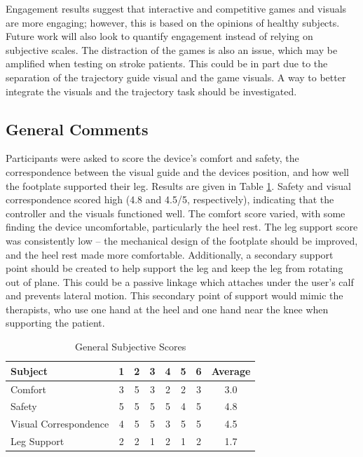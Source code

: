 \documentclass[12pt]{report}
\begin{document}
	Engagement results suggest that interactive and competitive games and visuals are more engaging; however, this is based on the opinions of healthy subjects. Future work will also look to quantify engagement instead of relying on subjective scales. The distraction of the games is also an issue, which may be amplified when testing on stroke patients. This could be in part due to the separation of the trajectory guide visual and the game visuals. A way to better integrate the visuals and the trajectory task should be investigated. 
	
	
\subsection{General Comments} \label{sec:general}
	
	Participants were asked to score the device's comfort and safety, the correspondence between the visual guide and the devices position, and how well the footplate supported their leg. Results are given in Table \ref{tab:general}. Safety and visual correspondence scored high (4.8 and 4.5/5, respectively), indicating that the controller and the visuals functioned well. The comfort score varied, with some finding the device uncomfortable, particularly the heel rest. The leg support score was consistently low -- the mechanical design of the footplate should be improved, and the heel rest made more comfortable. Additionally, a secondary support point should be created to help support the leg and keep the leg from rotating out of plane. This could be a passive linkage which attaches under the user's calf and prevents lateral motion. This secondary point of support would mimic the therapists, who use one hand at the heel and one hand near the knee when supporting the patient. 
	
	\begin{table}[h] \label{tab:general}
	\centering \doublespacing
	\caption{General Subjective Scores}
	\begin{tabular}{l c c c c c c c }
	\toprule
	Subject & 1 & 2 & 3 & 4 & 5 & 6 & Average \\
	\midrule
	\rowcolor{gray!10} Comfort & 3 & 5 & 3 & 2 & 2 & 3 & 3.0 \\
	Safety & 5 & 5 & 5 & 5 & 4 & 5 & 4.8 \\
	\rowcolor{gray!10} Visual Correspondence & 4 & 5 & 5 & 3 & 5 & 5 & 4.5 \\
	Leg Support & 2 & 2 & 1 & 2 & 1 & 2 & 1.7 \\
	\bottomrule
	\end{tabular}
	\end{table}
	
\end{document}
